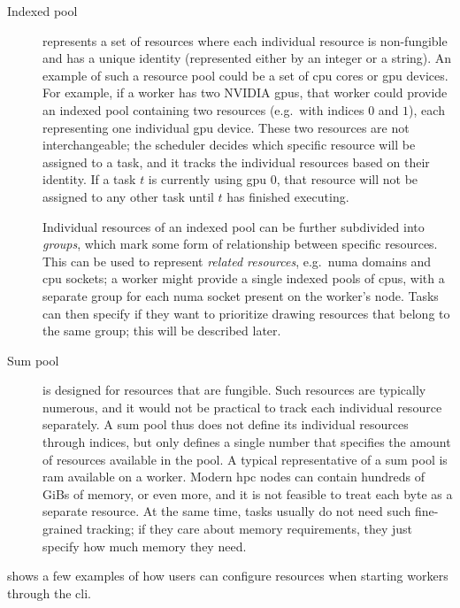 \begin{description}
	\item [Indexed pool] represents a set of resources where each individual resource is
	      non-fungible and has a unique identity (represented either by an integer or a string). An example
	      of such a resource pool could be a set of \gls{cpu} cores or \gls{gpu}
	      devices. For example, if a worker has two NVIDIA \glspl{gpu}, that worker could provide
	      an indexed pool containing two resources (e.g.\ with indices $0$ and
	      $1$), each representing one individual \gls{gpu} device. These two
	      resources are not interchangeable; the scheduler decides which specific resource will be assigned
	      to a task, and it tracks the individual resources based on their identity. If a task
	      $t$ is currently using \gls{gpu} $0$, that
	      resource will not be assigned to any other task until $t$ has finished executing.

	      Individual resources of an indexed pool can be further subdivided into \emph{groups},
	      which mark some form of relationship between specific resources. This can be used to
	represent \emph{related resources}, e.g.\ \gls{numa} domains and \gls{cpu} sockets; a worker
		  might provide a single indexed pools of \glspl{cpu}, with a separate group for each
	      \gls{numa} socket present on the worker's node. Tasks can then specify if they want to
	      prioritize drawing resources that belong to the same group; this will be described later.
	\item [Sum pool] is designed for resources that are fungible. Such resources are typically
	      numerous, and it would not be practical to track each individual resource separately. A sum pool
	      thus does not define its individual resources through indices, but only defines a single number
	      that specifies the amount of resources available in the pool. A typical representative of a sum
	      pool is \gls{ram} available on a worker. Modern \gls{hpc} nodes can
	      contain hundreds of GiBs of memory, or even more, and it is not feasible to treat each byte as a
	      separate resource. At the same time, tasks usually do not need such fine-grained tracking; if they
	      care about memory requirements, they just specify how much memory they need.
\end{description}

 shows a few examples of how users can configure resources
when starting workers through the \gls{cli}.

